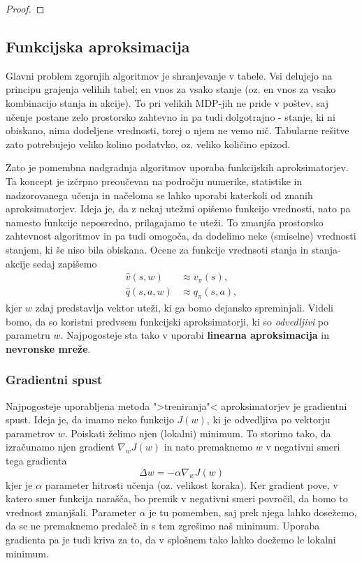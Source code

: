\documentclass[12pt,a4paper]{amsart}
\theoremstyle{definition} %
\theoremstyle{plain} %
\begin{document}
\begin{proof}
    
\end{proof}

\subsection{Funkcijska aproksimacija}
Glavni problem zgornjih algoritmov je shranjevanje v tabele. Vsi delujejo na principu grajenja 
velihih tabel; en vnos za vsako stanje (oz. en vnos za vsako kombinacijo stanja in akcije). To pri 
velikih MDP-jih ne pride v poštev, saj učenje postane zelo prostorsko zahtevno in pa tudi 
dolgotrajno - stanje, ki ni obiskano, nima dodeljene vrednosti, torej o njem ne vemo nič. Tabularne 
rešitve zato potrebujejo veliko kolino podatvko, oz. veliko količino epizod.  

Zato je pomembna nadgradnja algoritmov uporaba funkcijskih aproksimatorjev. Ta koncept je izčrpno 
preoučevan na področju numerike, statistike in nadzorovanega učenja in načeloma se lahko uporabi 
katerkoli od znanih aproksimatorjev. Ideja je, da z nekaj utežmi opišemo funkcijo vrednosti, nato 
pa namesto funkcije neposredno, prilagajamo te uteži. To zmanjša prostorsko zahtevnost algoritmov 
in pa tudi omogoča, da dodelimo neke (smiselne) vrednosti stanjem, ki še niso bila obiskana. Ocene 
za funkcije vrednsoti stanja in stanja-akcije sedaj zapišemo
\begin{align*}
    \hat{v}(s, w) &\approx v_\pi(s), \\
    \hat{q}(s, a, w) &\approx q_\pi(s, a), 
\end{align*}
kjer $w$ zdaj predstavlja vektor uteži, ki ga bomo dejansko spreminjali. Videli bomo, da so koristni
predvsem funkcijski aproksimatorji, ki so \textit{odvedljivi} po parametru $w$. Najpogosteje sta tako v 
uporabi \textbf{linearna aproksimacija} in \textbf{nevronske mreže}. 

\subsubsection{Gradientni spust}
Najpogosteje uporabljena metoda ">treniranja"< aproksimatorjev je gradientni spust. Ideja je, da 
imamo neko funkcijo $J(w)$, ki je odvedljiva po vektorju parametrov $w$. Poiskati želimo njen 
(lokalni) minimum. To storimo tako, da izračunamo njen gradient $\nabla_wJ(w)$ in nato premaknemo $w$
v negativni smeri tega gradienta
$$
\Delta w = - \alpha \nabla_wJ(w)
$$
kjer je $\alpha$ parameter hitrosti učenja (oz. velikost koraka). Ker gradient pove, v katero smer 
funkcija narašča, bo premik v negativni smeri povročil, da bomo to vrednost zmanjšali. Parameter 
$\alpha$ je tu pomemben, saj prek njega lahko dosežemo, da se ne premaknemo predaleč in s tem zgrešimo
naš minimum. Uporaba gradienta pa je tudi kriva za to, da v splošnem tako lahko doežemo le lokalni 
minimum. 
\end{document}
